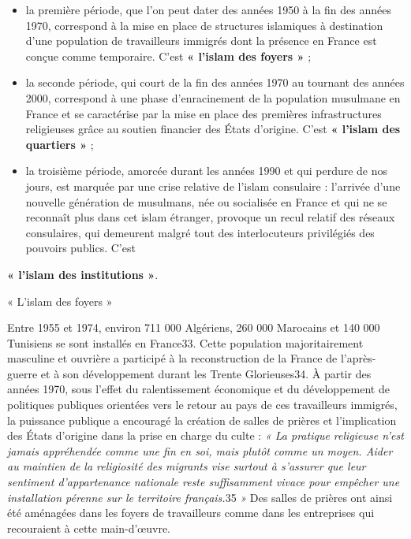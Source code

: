 \begin{itemize}
\item
  la première période, que l'on peut dater des années 1950 à la fin des
  années 1970, correspond à la mise en place de structures islamiques à
  destination d'une population de travailleurs immigrés dont la présence
  en France est conçue comme temporaire. C'est \textbf{« l'islam des
  foyers »} ;
\item
  la seconde période, qui court de la fin des années 1970 au tournant
  des années 2000, correspond à une phase d'enracinement de la
  population musulmane en France et se caractérise par la mise en place
  des premières infrastructures religieuses grâce au soutien financier
  des États d'origine. C'est \textbf{« l'islam des quartiers »} ;
\item
  la troisième période, amorcée durant les années 1990 et qui perdure de
  nos jours, est marquée par une crise relative de l'islam consulaire :
  l'arrivée d'une nouvelle génération de musulmans, née ou socialisée en
  France et qui ne se reconnaît plus dans cet islam étranger, provoque
  un recul relatif des réseaux consulaires, qui demeurent malgré tout
  des interlocuteurs privilégiés des pouvoirs publics. C'est
\end{itemize}


\textbf{« l'islam des institutions »}.


« L'islam des foyers »


Entre 1955 et 1974, environ 711 000 Algériens, 260 000 Marocains et 140
000 Tunisiens se sont installés en France33. Cette population
majoritairement masculine et ouvrière a participé à la reconstruction de
la France de l'après-guerre et à son développement durant les Trente
Glorieuses34. À partir des années 1970, sous l'effet du ralentissement
économique et du développement de politiques publiques orientées vers le
retour au pays de ces travailleurs immigrés, la puissance publique a
encouragé la création de salles de prières et l'implication des États
d'origine dans la prise en charge du culte : \emph{« La pratique
religieuse n'est jamais appréhendée comme une fin en soi, mais plutôt
comme un moyen. Aider au maintien de la religiosité des migrants vise
surtout à s'assurer que leur sentiment d'appartenance nationale reste
suffisamment vivace pour empêcher une installation pérenne sur le
territoire français.}35 \emph{»} Des salles de prières ont ainsi été
aménagées dans les foyers de travailleurs comme dans les entreprises qui
recouraient à cette main-d'œuvre.

